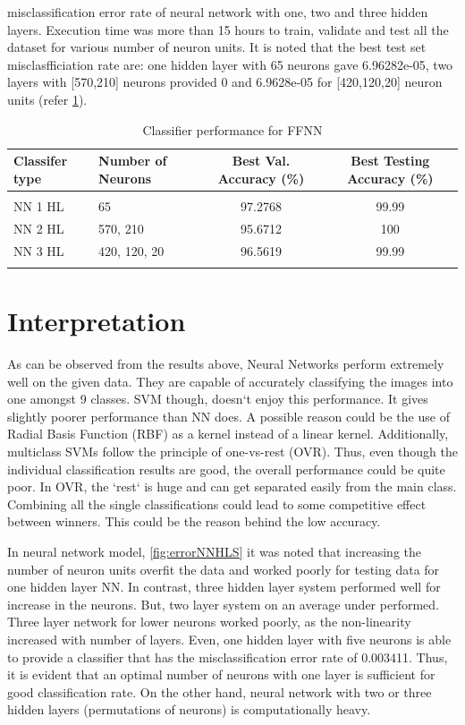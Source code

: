 \documentclass[letterpaper,12pt, onecolumn]{article}%
\begin{document}
misclassification error rate of neural network with one, two and three hidden layers. Execution time was more than 15 hours to train, validate and test all the dataset for various number of neuron units. It is noted that the best test set misclasfficiation rate are: one hidden layer with 65 neurons gave 6.96282e-05, two layers with [570,210] neurons provided 0 and 6.9628e-05 for [420,120,20] neuron units (refer \cref{tab:classifier_performance_ffnn}).

\begin{table}[!htbp]
\centering
 \begin{tabular}{ l l  c c }
 \hline
 Classifer type & Number of Neurons & Best Val. Accuracy (\%) &  Best Testing Accuracy (\%)  \\ [0.5ex]
 \hline\hline \\ [-1.5ex]
	NN 1 HL & 65 & 97.2768 & 99.99  \\ 
	NN 2 HL & 570, 210 &  95.6712 & 100   \\ 
	NN 3 HL & 420, 120, 20 & 96.5619 & 99.99  \\ 
\hline \\ 
 \hline
 \end{tabular}
  	   \caption{Classifier performance for FFNN}
       \label{tab:classifier_performance_ffnn}
\end{table}

\section{Interpretation} \label{sec:interp} %
\noindent
As can be observed from the results above, Neural Networks perform extremely well on the given data. They are capable of accurately classifying the images into one amongst 9 classes. SVM though, doesn`t enjoy this performance. It gives slightly poorer performance than NN does. A possible reason could be the use of Radial Basis Function (RBF) as a kernel instead of a linear kernel. Additionally, multiclass SVMs follow the principle of one-vs-rest (OVR). Thus, even though the individual classification results are good, the overall performance could be quite poor. In OVR, the `rest` is huge and can get separated easily from the main class. Combining all the single classifications could lead to some competitive effect between winners. This could be the reason behind the low accuracy.

In neural network model, \cref{fig:errorNNHLS} it was noted that increasing the number of neuron units overfit the data and worked poorly for testing data for one hidden layer NN. In contrast, three hidden layer system performed well for increase in the neurons. But, two layer system on an average under performed. Three layer network for lower neurons worked poorly, as the non-linearity increased with number of layers. Even, one hidden layer with five neurons is able to provide a classifier that has the misclassification error rate of 0.003411. Thus, it is evident that an optimal number of neurons with one layer is sufficient for good classification rate. On the other hand, neural network with two or three hidden layers (permutations of neurons) is computationally heavy.
\end{document}
